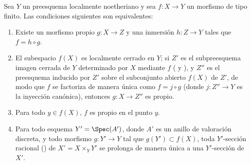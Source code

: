 \begin{corollary}[15.7.6]
\label{IV.15.7.6}
Sea $Y$ un preesquema localmente noetheriano y sea $f:X\to Y$ un morfismo de tipo finito.
Las condiciones siguientes son equivalentes:
\begin{enumerate}[label=\emph{\alph*)}]
  \item Existe un morfismo propio $g:X\to Z$ y una inmersión $h:Z\to Y$ tales que $f=h\circ g$.
  \item El subespacio $f(X)$ es localmente cerrado en $Y$; si $Z'$ es el subpreesquema imagen cerrada de $Y$ determinado por $X$ mediante $f$ \textup{( y )}, y $Z''$ es el preesquema inducido por $Z'$ sobre el subconjunto abierto $f(X)$ de $Z'$, de modo que $f$ se factoriza de manera única como $f=j\circ g$ (donde $j:Z''\to Y$ es la inyección canónica), entonces $g:X\to Z''$ es propio.
  \item Para todo $y\in f(X)$, $f$ es propio en el punto $y$.
  \item Para todo esquema $Y'=\Spec(A')$, donde $A'$ es un anillo de valoración discreta, y todo morfismo $g:Y'\to Y$ tal que $g(Y')\subset f(X)$, toda $Y'$-sección racional \textup{()} de $X'=X\times_Y Y'$ se prolonga de manera única a una $Y'$-sección de $X'$.
\end{enumerate}
\end{corollary}

